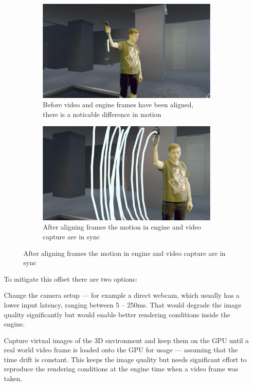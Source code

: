 \begin{figure}[htbp]
	\caption[Aligned and unaligned frames]{Visual comparison between unaligned 
	and aligned frames\footnotemark}
	\label{fig:offsets:example}
	\begin{subfigure}[t]{.45\textwidth}
		\centering
		\includegraphics[width=\textwidth]{gfx/offsets/not_aligned.png}
		\caption{Before video and engine frames have been aligned, there is a 
		noticable difference in motion}
	\end{subfigure}
	\begin{subfigure}[t]{.45\textwidth}
		\centering
		\includegraphics[width=\textwidth]{gfx/offsets/aligned.png}
		\caption{After aligning frames the motion in engine and video capture 
		are in sync}
	\end{subfigure}
\end{figure}


To mitigate this offset there are two options:

\begin{my_list}
	\item Change the camera setup --- for example a direct webcam, which 
	usually has a lower input latency, ranging between 5 -- 250ms. That would 
	degrade the image quality significantly but would enable better rendering 
	conditions inside the engine.
	\item Capture virtual images of the 3D environment and keep them on the GPU 
	until a real world video frame is loaded onto the GPU for usage --- 
	assuming that the time drift is constant. This keeps the image quality but 
	needs significant effort to reproduce the rendering conditions at the 
	engine time when a video frame was taken.
\end{my_list}


